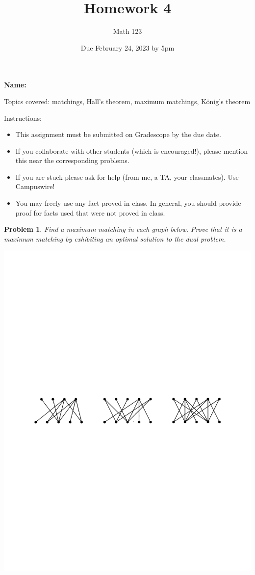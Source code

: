 \documentclass[11pt]{article}
\author{Math 123}
\date{Due February 24, 2023 by 5pm}
\title{Homework 4}
\newtheorem{problem}{Problem}
\begin{document}
\maketitle

{\bf\Large Name:} 


\vspace{.3in}
Topics covered: matchings, Hall's theorem, maximum matchings, K\"onig's theorem

Instructions: 
\begin{itemize}
\item This assignment must be submitted on Gradescope by the due date. 
\item If you collaborate with other students (which is encouraged!), please mention this near the corresponding problems. 
\item If you are stuck please ask for help (from me, a TA, your classmates). Use Campuswire! 
\item You may freely use any fact proved in class. In general, you should provide proof for facts used that were not proved in class. 
\end{itemize}

\pagebreak 



\begin{problem}
Find a maximum matching in each graph below. Prove that it is a maximum matching by exhibiting an optimal solution to the dual problem. 
\begin{center}
\includegraphics[scale=.8]{matchings.pdf}
\end{center}
\end{problem}
\end{document}
